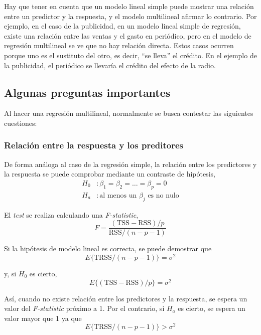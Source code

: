 Hay que tener en cuenta que un modelo lineal simple puede mostrar una relación entre un predictor y la respuesta, y el modelo multilineal afirmar lo contrario. Por ejemplo, en el caso de la publicidad, en un modelo lineal simple de regresión, existe una relación entre las ventas y el gasto en periódico, pero en el modelo de regresión multilineal se ve que no hay relación directa. Estos casos ocurren porque uno es el sustituto del otro, es decir, ``se lleva'' el crédito. En el ejemplo de la publicidad, el periódico se llevaría el crédito del efecto de la radio. 

\subsection{Algunas preguntas importantes}

Al hacer una regresión multilineal, normalmente se busca contestar las siguientes cuestiones:

\subsubsection{Relación entre la respuesta y los preditores}

De forma análoga al caso de la regresión simple, la relación entre los predictores y la respuesta se puede comprobar mediante un contraste de hipótesis, 
\begin{align}
H_0 &: \beta_1 = \beta_2 = \dots = \beta_p = 0 \\
H_a &: \text{al menos un } \beta_j \text{ es no nulo}
\end{align}

\noindent El \textit{test} se realiza calculando una \textit{F-statistic}, 
\begin{equation}
F = \frac{(\text{TSS} - \text{RSS})/p}{\text{RSS}/(n - p - 1)}
\label{eq:3.23}
\end{equation}

\noindent Si la hipótesis de modelo lineal es correcta, se puede demostrar que 
\begin{equation}
E\{\text{TRSS}/(n - p - 1)\} = \sigma^2
\end{equation}

\noindent y, si $H_0$ es cierto, 
\begin{equation}
E\{(\text{TSS} - \text{RSS})/p\} = \sigma^2 
\end{equation}

Así, cuando no existe relación entre los predictores y la respuesta, se espera un valor del \textit{F-statistic} próximo a 1. Por el contrario, si $H_a$ es cierto, se espera un valor mayor que 1 ya que 
\begin{equation}
E\{\text{TRSS}/(n - p - 1)\} > \sigma^2
\end{equation}


